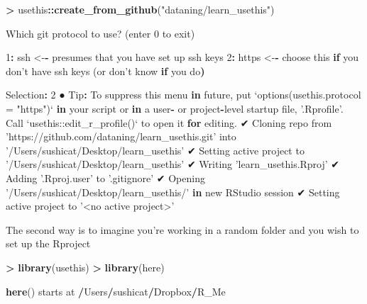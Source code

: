 \documentclass[]{book}
\newenvironment{Shaded}{\begin{snugshade}}{\end{snugshade}}
\newcommand{\ControlFlowTok}[1]{\textcolor[rgb]{0.13,0.29,0.53}{\textbf{#1}}}
\newcommand{\DataTypeTok}[1]{\textcolor[rgb]{0.13,0.29,0.53}{#1}}
\newcommand{\DecValTok}[1]{\textcolor[rgb]{0.00,0.00,0.81}{#1}}
\newcommand{\ErrorTok}[1]{\textcolor[rgb]{0.64,0.00,0.00}{\textbf{#1}}}
\newcommand{\KeywordTok}[1]{\textcolor[rgb]{0.13,0.29,0.53}{\textbf{#1}}}
\newcommand{\NormalTok}[1]{#1}
\newcommand{\OperatorTok}[1]{\textcolor[rgb]{0.81,0.36,0.00}{\textbf{#1}}}
\newcommand{\StringTok}[1]{\textcolor[rgb]{0.31,0.60,0.02}{#1}}
\begin{document}
\begin{Shaded}
\begin{Highlighting}[]
\OperatorTok{>}\StringTok{ }\NormalTok{usethis}\OperatorTok{::}\KeywordTok{create_from_github}\NormalTok{(}\StringTok{"dataning/learn_usethis"}\NormalTok{)}

\NormalTok{Which git protocol to use? (enter }\DecValTok{0}\NormalTok{ to exit) }

\DecValTok{1}\OperatorTok{:}\StringTok{ }\NormalTok{ssh   <-}\OperatorTok{-}\StringTok{ }\NormalTok{presumes that you have set up ssh keys}
\DecValTok{2}\OperatorTok{:}\StringTok{ }\NormalTok{https <-}\OperatorTok{-}\StringTok{ }\NormalTok{choose this }\ControlFlowTok{if}\NormalTok{ you don}\StringTok{'t have ssh keys (or don'}\NormalTok{t know }\ControlFlowTok{if}\NormalTok{ you do}\ErrorTok{)}

\NormalTok{Selection}\OperatorTok{:}\StringTok{ }\DecValTok{2}
\NormalTok{● Tip}\OperatorTok{:}\StringTok{ }\NormalTok{To suppress this menu }\ControlFlowTok{in}\NormalTok{ future, put}
  \StringTok{`}\DataTypeTok{options(usethis.protocol = "https")}\StringTok{`}
  \ControlFlowTok{in}\NormalTok{ your script or }\ControlFlowTok{in}\NormalTok{ a user}\OperatorTok{-}\StringTok{ }\NormalTok{or project}\OperatorTok{-}\NormalTok{level startup file, }\StringTok{'.Rprofile'}\NormalTok{.}
\NormalTok{  Call }\StringTok{`}\DataTypeTok{usethis::edit_r_profile()}\StringTok{`}\NormalTok{ to open it }\ControlFlowTok{for}\NormalTok{ editing.}
\NormalTok{✔ Cloning repo from }\StringTok{'https://github.com/dataning/learn_usethis.git'}\NormalTok{ into }\StringTok{'/Users/sushicat/Desktop/learn_usethis'}
\NormalTok{✔ Setting active project to }\StringTok{'/Users/sushicat/Desktop/learn_usethis'}
\NormalTok{✔ Writing }\StringTok{'learn_usethis.Rproj'}
\NormalTok{✔ Adding }\StringTok{'.Rproj.user'}\NormalTok{ to }\StringTok{'.gitignore'}
\NormalTok{✔ Opening }\StringTok{'/Users/sushicat/Desktop/learn_usethis/'} \ControlFlowTok{in}\NormalTok{ new RStudio session}
\NormalTok{✔ Setting active project to }\StringTok{'<no active project>'}
\end{Highlighting}
\end{Shaded}

The second way is to imagine you're working in a random folder and you wish to set up the Rproject

\begin{Shaded}
\begin{Highlighting}[]
\OperatorTok{>}\StringTok{ }\KeywordTok{library}\NormalTok{(usethis)}
\OperatorTok{>}\StringTok{ }\KeywordTok{library}\NormalTok{(here)}

\KeywordTok{here}\NormalTok{() starts at }\OperatorTok{/}\NormalTok{Users}\OperatorTok{/}\NormalTok{sushicat}\OperatorTok{/}\NormalTok{Dropbox}\OperatorTok{/}\NormalTok{R_Me}
\end{Highlighting}
\end{Shaded}
\end{document}

